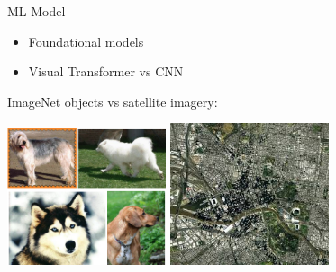 \begin{frame}{ML Model}
     \begin{itemize}
        \item Foundational models
        \item Visual Transformer vs CNN
    \end{itemize}
    ImageNet objects vs satellite imagery:

    \includegraphics[height=0.35\textheight,width=0.35\textwidth,keepaspectratio]{images/mm_ml/Dogs.png}
    \includegraphics[height=0.35\textheight,width=0.35\textwidth,keepaspectratio]{images/mm_ml/Satellite.jpeg}
   
\end{frame}






